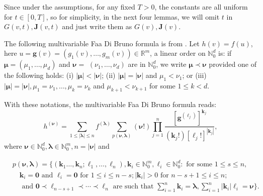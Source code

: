\documentclass[a4paper, 11pt]{article}
\theoremstyle{plain}
\theoremstyle{remark}
\theoremstyle{definition}
\newcommand{\J}{\boldsymbol{J}}
\begin{document}
        
Since under the assumptions, for any fixed $T>0$, the constants are all uniform for $t\in [0,T]$, so for simplicity, in the next four lemmas, we will omit $t$ in $G(v,t),\J(v,t)$ and just write them as $G(v),\J(v)$.
		
		The following multivariable Faa Di Bruno formula is from \cite[Theorem 2]{constantine1996multivariate}. Let $h(v)=f(u)$, here $u=\boldsymbol{g}(v)=\left(g_1(v),\ldots,g_m(v)\right)\in \mathbb{R}^m$, a linear order on $\mathbb{N}_0^d$ is: if $\boldsymbol{\mu}=\left(\mu_1, \ldots, \mu_d\right)$ and $\boldsymbol{\nu}=$ $\left(\nu_1, \ldots, \nu_d\right)$ are in $\mathbb{N}_0^d$, we write $\boldsymbol{\mu} \prec	\boldsymbol{\nu}$ provided one of the following holds:
		(i) $|\boldsymbol{\mu}|<|\boldsymbol{\nu}|$;
		(ii) $|\boldsymbol{\mu}|=|\boldsymbol{\nu}|$ and $\mu_1<\nu_1$; or
		(iii) $|\boldsymbol{\mu}|=|\boldsymbol{\nu}|, \mu_1=\nu_1, \ldots, \mu_k=\nu_k$ and $\mu_{k+1}<\nu_{k+1}$ for some $1 \leq k<d$.
		
		With these notations, the multivariable Faa Di Bruno formula reads:
		\begin{equation}
			h^{(\boldsymbol{\nu})}=\sum_{1 \leq|\boldsymbol{\lambda}| \leq n} f^{(\boldsymbol{\lambda})}  \sum_{p(\boldsymbol{\nu}, \boldsymbol{\lambda})}(\boldsymbol{\nu}!) \prod_{j=1}^n \frac{\left[\mathbf{g}^{(\boldsymbol{\ell}_j)}\right]^{\mathbf{k}_j}}{\left(\mathbf{k}_{j}!\right)\left[\boldsymbol{\ell}_{j}!\right]^{\left|\mathbf{k}_j\right|}},
		\end{equation}where $\boldsymbol{\nu}\in\mathbb{N}_0^d,\boldsymbol{\lambda}\in\mathbb{N}_0^m, n=|\boldsymbol{\nu}|$ and
		
		\begin{equation}
			\begin{aligned}
				& p(\boldsymbol{\nu}, \boldsymbol{\lambda})=\Big\{\left(\mathbf{k}_1 \ldots, \mathbf{k}_n ; \boldsymbol{\ell}_1, \ldots, \boldsymbol{\ell}_n\right), \mathbf{k}_i\in\mathbb{N}_0^m,\mathbf{\ell}_i\in\mathbb{N}_0^d: \text { for some } 1 \leq s \leq n, \\
				& \quad \mathbf{k}_i=\mathbf{0} \text { and } \boldsymbol{\ell}_i=\mathbf{0} \text { for } 1 \leq i \leq n-s ;\left|\mathbf{k}_i\right|>0 \text { for } n-s+1 \leq i \leq n ; \\
				& \quad \text { and } \mathbf{0} \prec \boldsymbol{\ell}_{n-s+1} \prec \cdots \prec \boldsymbol{\ell}_n \text { are such that }  \sum_{i=1}^n \mathbf{k}_i=\boldsymbol{\lambda}, \sum_{i=1}^n\left|\mathbf{k}_i\right| \boldsymbol{\ell}_i=\boldsymbol{\nu}\Big\} .
			\end{aligned}
		\end{equation}
		
\end{document}
